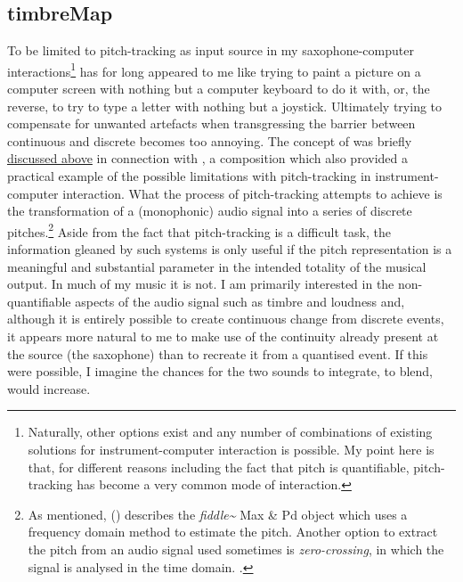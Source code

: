\subsection{timbreMap}
\label{sec:timbremap}



To be limited to pitch-tracking as input source in my saxophone-computer interactions\footnote{Naturally, other options exist and any number of combinations of existing solutions for instrument-computer interaction is possible. My point here is that, for different reasons including the fact that pitch is quantifiable, pitch-tracking has become a very common mode of interaction.} has for long appeared to me like trying to paint a picture on a computer screen with nothing but a computer keyboard to do it with, or, the reverse, to try to type a letter with nothing but a joystick. Ultimately trying to compensate for unwanted artefacts when transgressing the barrier between continuous and discrete becomes too annoying. The concept of  was briefly \hyperlink{sec:target:personal-background-4}{discussed above} in connection with , a composition which also provided a practical example of the possible limitations with pitch-tracking in instrument-computer interaction. What the process of pitch-tracking attempts to achieve is the transformation of a (monophonic) audio signal into a series of discrete pitches.\footnote{As mentioned, \citeauthor{puckette98} (\citeyear{puckette98}) describes the \emph{fiddle\~} Max \& Pd object which uses a frequency domain method to estimate the pitch. Another option to extract the pitch from an audio signal used sometimes is \emph{zero-crossing}, in which the signal is analysed in the time domain. \cite[For an example, see][]{cooper94}.} Aside from the fact that pitch-tracking is a difficult task, the information gleaned by such systems is only useful if the pitch representation is a meaningful and substantial parameter in the intended totality of the musical output. In much of my music it is not. I am primarily interested in the non-quantifiable aspects of the audio signal such as timbre and loudness and, although it is entirely possible to create continuous change from discrete events, it appears more natural to me to make use of the continuity already present at the source (the saxophone) than to recreate it from a quantised event. If this were possible, I imagine the chances for the two sounds to integrate, to blend, would increase.
